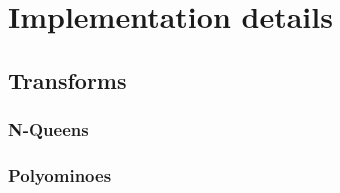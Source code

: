 
\chapter{Implementation details}
\label{implementation}




\section{Transforms}


\subsection{N-Queens}




\subsection{Polyominoes}


